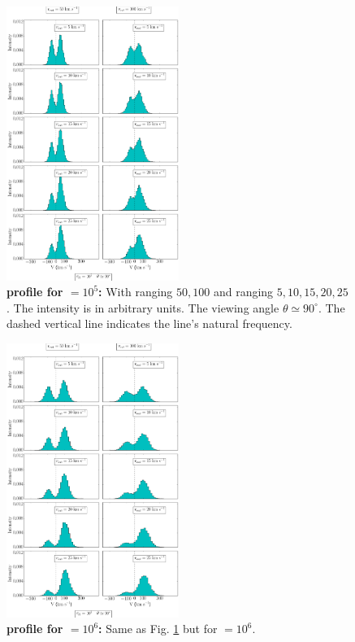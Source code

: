 \documentclass{latex/emulateapj}
\begin{document}
\newpage

\begin{figure}[h!]
	\begin{center}
		\includegraphics[width=0.5\textwidth]{./figures/3_tau10E5_phi83-90}
	\end{center}
	\caption{\textbf{\lya profile for \tauh$=10^5$:} With \vrot ranging $50,100$ \kms and \vout ranging $5,10,15,20,25$ \kms. The intensity is in arbitrary units. The viewing angle $\theta \simeq 90^\circ$. The dashed vertical line indicates the \lya line's natural frequency. 
		\label{fig:3_tau10E5_phi83-90}}
\end{figure}

\newpage

\begin{figure}[h!]
	\begin{center}
		\includegraphics[width=0.5\textwidth]{./figures/3_tau10E6_phi83-90}
	\end{center}
	\caption{\textbf{\lya profile for \tauh$=10^6$:}  Same as Fig. \ref{fig:3_tau10E5_phi83-90} but for \tauh$=10^6$.
		\label{fig:3_tau10E6_phi83-90}}
\end{figure}
\end{document}
